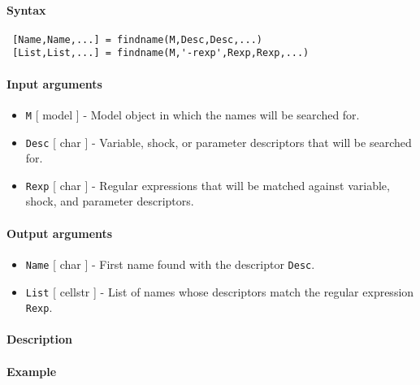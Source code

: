 


	\paragraph{Syntax}
 
 \begin{verbatim}
 [Name,Name,...] = findname(M,Desc,Desc,...)
 [List,List,...] = findname(M,'-rexp',Rexp,Rexp,...)
 \end{verbatim}
 
 \paragraph{Input arguments}
 
 \begin{itemize}
 \item
   \texttt{M} {[} model {]} - Model object in which the names will be
   searched for.
 \item
   \texttt{Desc} {[} char {]} - Variable, shock, or parameter descriptors
   that will be searched for.
 \item
   \texttt{Rexp} {[} char {]} - Regular expressions that will be matched
   against variable, shock, and parameter descriptors.
 \end{itemize}
 
 \paragraph{Output arguments}
 
 \begin{itemize}
 \item
   \texttt{Name} {[} char {]} - First name found with the descriptor
   \texttt{Desc}.
 \item
   \texttt{List} {[} cellstr {]} - List of names whose descriptors match
   the regular expression \texttt{Rexp}.
 \end{itemize}
 
 \paragraph{Description}
 
 \paragraph{Example}



